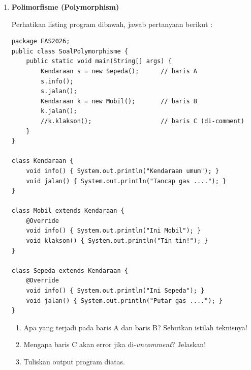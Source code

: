 \documentclass[11pt]{article}
\begin{document}
\begin{enumerate}
\begin{center}
\begin{minipage}{0.47\textwidth}
\begin{verbatim}
    HargaDiskon(String nama, double harga, double diskon) {
        // lengkapi;
    }

    public double nettoHarga(int jumlahBarang) {
        // lengkapi;
    }
}
  \end{verbatim}
          \end{minipage}
        \end{center}

        Lengkapi program di atas pada:
        \begin{enumerate}[label=\alph*)]
          \item Constructor pada kelas \texttt{Barang} dan kelas \texttt{HargaDiskon}
          \item Method \texttt{nettoHarga} dimana jumlah barang $\geq 8$ maka mendapatkan diskon.
          \item Kelas \texttt{Toko} untuk menampilkan output: Harga Netto = 12000 dengan memasukkan jumlah barang 10.
        \end{enumerate}

  \item \textbf{Polimorfisme (Polymorphism)}

        Perhatikan listing program dibawah, jawab pertanyaan berikut :

        \begin{verbatim}
package EAS2026;
public class SoalPolymorphisme {
    public static void main(String[] args) {
        Kendaraan s = new Sepeda();      // baris A
        s.info();
        s.jalan();
        Kendaraan k = new Mobil();       // baris B
        k.jalan();
        //k.klakson();                   // baris C (di-comment)
    }
}

class Kendaraan {
    void info() { System.out.println("Kendaraan umum"); }
    void jalan() { System.out.println("Tancap gas ...."); }
}

class Mobil extends Kendaraan {
    @Override
    void info() { System.out.println("Ini Mobil"); }
    void klakson() { System.out.println("Tin tin!"); }
}

class Sepeda extends Kendaraan {
    @Override
    void info() { System.out.println("Ini Sepeda"); }
    void jalan() { System.out.println("Putar gas ...."); }
}
  \end{verbatim}

        \begin{enumerate}[label=\alph*)]
          \item Apa yang terjadi pada baris A dan baris B? Sebutkan istilah teknisnya!
          \item Mengapa baris C akan error jika di-\textit{uncomment}? Jelaskan!
          \item Tuliskan output program diatas.
        \end{enumerate}


\end{enumerate}
\end{document}
